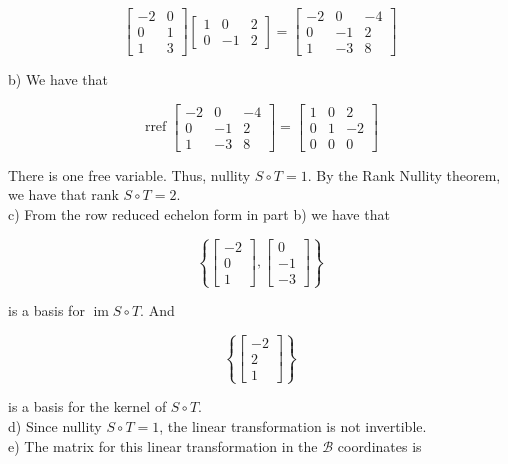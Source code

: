 \documentclass[10pt]{article}
\begin{document}
$$
\left[\begin{array}{cc}
-2 & 0 \\
0 & 1 \\
1 & 3
\end{array}\right]\left[\begin{array}{ccc}
1 & 0 & 2 \\
0 & -1 & 2
\end{array}\right]=\left[\begin{array}{ccc}
-2 & 0 & -4 \\
0 & -1 & 2 \\
1 & -3 & 8
\end{array}\right]
$$

b) We have that

$$
\operatorname{rref}\left[\begin{array}{ccc}
-2 & 0 & -4 \\
0 & -1 & 2 \\
1 & -3 & 8
\end{array}\right]=\left[\begin{array}{ccc}
1 & 0 & 2 \\
0 & 1 & -2 \\
0 & 0 & 0
\end{array}\right]
$$

There is one free variable. Thus, nullity $S \circ T=1$. By the Rank Nullity theorem, we have that rank $S \circ T=2$.\\
c) From the row reduced echelon form in part b) we have that

$$
\left\{\left[\begin{array}{c}
-2 \\
0 \\
1
\end{array}\right],\left[\begin{array}{c}
0 \\
-1 \\
-3
\end{array}\right]\right\}
$$

is a basis for $\operatorname{im} S \circ T$. And

$$
\left\{\left[\begin{array}{c}
-2 \\
2 \\
1
\end{array}\right]\right\}
$$

is a basis for the kernel of $S \circ T$.\\
d) Since nullity $S \circ T=1$, the linear transformation is not invertible.\\
e) The matrix for this linear transformation in the $\mathcal{B}$ coordinates is
\end{document}
